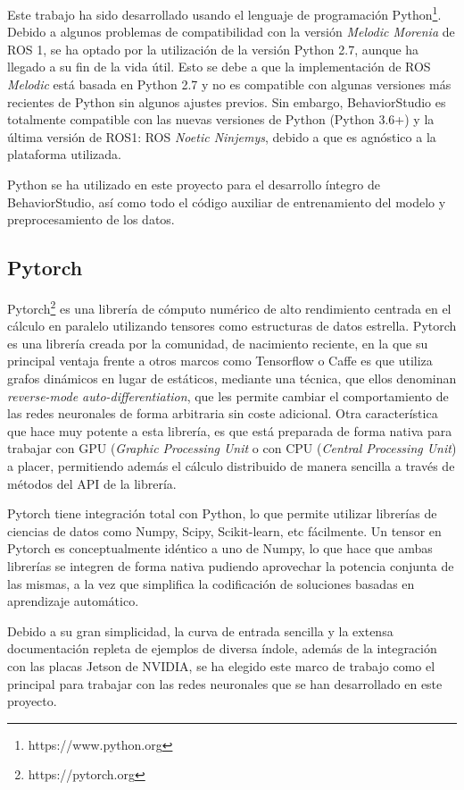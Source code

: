 Este trabajo ha sido desarrollado usando el lenguaje de programación Python\footnote{https://www.python.org}. Debido a algunos problemas de compatibilidad con la versión \textit{Melodic Morenia} de ROS 1, se ha optado por la utilización de la versión Python 2.7, aunque ha llegado a su fin de la vida útil. Esto se debe a que la implementación de ROS \textit{Melodic} está basada en Python 2.7 y no es compatible con algunas versiones más recientes de Python sin algunos ajustes previos. Sin embargo, BehaviorStudio es totalmente compatible con las nuevas versiones de Python (Python 3.6+) y la última versión de ROS1: ROS \textit{Noetic Ninjemys}, debido a que es agnóstico a la plataforma utilizada. 

Python se ha utilizado en este proyecto para el desarrollo íntegro de BehaviorStudio, así como todo el código auxiliar de entrenamiento del modelo y preprocesamiento de los datos.

\subsection{Pytorch}

Pytorch\footnote{https://pytorch.org} es una librería de cómputo numérico de alto rendimiento centrada en el cálculo en paralelo utilizando tensores como estructuras de datos estrella. Pytorch es una librería creada por la comunidad, de nacimiento reciente, en la que su principal ventaja frente a otros marcos como Tensorflow o Caffe es que utiliza grafos dinámicos en lugar de estáticos, mediante una técnica, que ellos denominan \textit{reverse-mode auto-differentiation}, que les permite cambiar el comportamiento de las redes neuronales de forma arbitraria sin coste adicional. Otra característica que hace muy potente a esta librería, es que está preparada de forma nativa para trabajar con GPU (\textit{Graphic Processing Unit} o con CPU (\textit{Central Processing Unit}) a placer, permitiendo además el cálculo distribuido de manera sencilla a través de métodos del API de la librería.

Pytorch tiene integración total con Python, lo que permite utilizar librerías de ciencias de datos como Numpy, Scipy, Scikit-learn, etc fácilmente. Un tensor en Pytorch es conceptualmente idéntico a uno de Numpy, lo que hace que ambas librerías se integren de forma nativa pudiendo aprovechar la potencia conjunta de las mismas, a la vez que simplifica la codificación de soluciones basadas en aprendizaje automático.

Debido a su gran simplicidad, la curva de entrada sencilla y la extensa documentación repleta de ejemplos de diversa índole, además de la integración con las placas Jetson de NVIDIA, se ha elegido este marco de trabajo como el principal para trabajar con las redes neuronales que se han desarrollado en este proyecto.

